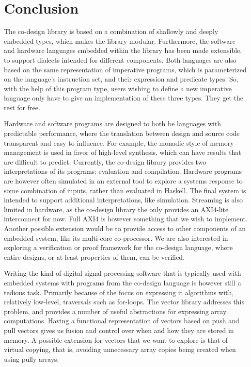 \documentclass[../paper.tex]{subfiles}
\begin{document}
\section{Conclusion}
\label{conc}

The co-design library is based on a combination of shallowly and deeply embedded types, which makes the library modular. Furthermore, the software and hardware languages embedded within the library has been made extensible, to support dialects intended for different components. Both languages are also based on the same representation of imperative programs, which is parameterized on the language's instruction set, and their expression and predicate types. So, with the help of this program type, users wishing to define a new imperative language only have to give an implementation of these three types. They get the rest for free.


Hardware and software programs are designed to both be languages with predictable performance, where the translation between design and source code transparent and easy to influence. For example, the monadic style of memory management is used in favor of high-level synthesis, which can have results that are difficult to predict. Currently, the co-design library provides two interpretations of its programs: evaluation and compilation. Hardware programs are however often simulated in an external tool to explore a systems response to some combination of inputs, rather than evaluated in Haskell. The final system is intended to support additional interpretations, like simulation. Streaming is also limited in hardware, as the co-design library the only provides an AXI4-lite interconnect for now. Full AXI4 is however something that we wish to implement. Another possible extension would be to provide access to other components of an embedded system, like its multi-core co-processor. We are also interested in exploring a verification or proof framework for the co-design language, where entire designs, or at least properties of them, can be verified.

Writing the kind of digital signal processing software that is typically used with embedded systems with programs from the co-design language is however still a tedious task. Primarily because of the focus on expressing it algorithms with, relatively low-level, traversals such as for-loops. The vector library addresses this problem, and provides a number of useful abstractions for expressing array computations. Having a functional representation of vectors based on push and pull vectors gives us fusion and control over when and how they are stored in memory. A possible extension for vectors that we want to explore is that of virtual copying, that is, avoiding unnecessary array copies being created when using pully arrays.
\end{document}
